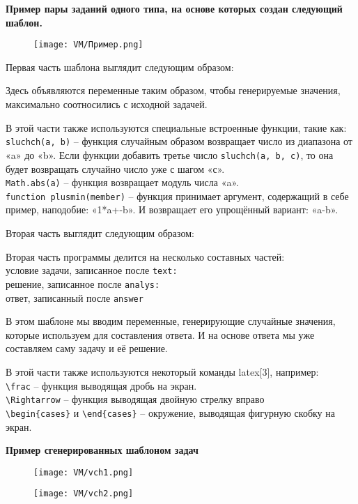 \textbf{Пример пары заданий одного типа, на основе которых создан следующий шаблон. } 

\begin{figure}[h]
		\centering
		\texttt{[image: VM/Пример.png]}
\label{ris:image}
\end{figure}

Первая часть шаблона выглядит следующим образом:



Здесь объявляются переменные таким образом, чтобы генерируемые значения,  максимально соотносились с исходной задачей.

В этой части также используются специальные встроенные функции, такие как:
\\ \texttt{sluchch(a, b)} – функция случайным образом возвращает число из диапазона от «a» до «b». Если функции добавить третье число \texttt{sluchch(a, b, с)}, то она будет возвращать случайно число уже с шагом «с».
\\ \texttt{Math.abs(a)} – функция возвращает модуль числа «a».
\\ \texttt{function plusmin(member)} – функция принимает аргумент, содержащий в себе пример, наподобие: «1*a+-b». И возвращает его упрощённый вариант: «a-b».

Вторая часть выглядит следующим образом:



Вторая часть программы делится на несколько составных частей:
\\ условие задачи, записанное после \texttt{text:}
\\ решение, записанное после \texttt{analys:}
\\ ответ, записанный после \texttt{answer}

В этом шаблоне мы вводим переменные, генерирующие случайные значения, которые используем для составления ответа. И на основе ответа мы уже составляем саму задачу и её решение.

В этой части также используются некоторый команды latex[3], например:
\\ \texttt{\textbackslash frac} – функция выводящая дробь на экран.
\\ \texttt{\textbackslash Rightarrow} – функция выводящая двойную стрелку вправо
\\ \texttt{\textbackslash begin\{cases\}} и \texttt{\textbackslash end\{cases\}} – окружение, выводящая фигурную скобку на экран.

\textbf{ Пример сгенерированных шаблоном задач}

 	\begin{figure}[h]
		\centering
		\texttt{[image: VM/vch1.png]}
		 		\end{figure}
		 	\begin{figure}[h]
		\centering
		\texttt{[image: VM/vch2.png]}
	\end{figure}
